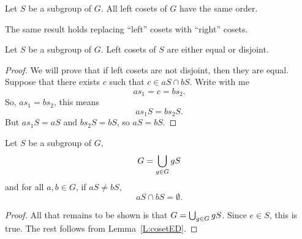\documentclass{ximera}
\begin{document}
\begin{corollary}
  Let $S$ be a subgroup of $G$. All left cosets of $G$ have the same
  order.
\end{corollary}

\begin{remark}
  The same result holds replacing ``left'' cosets with ``right''
  cosets.
\end{remark}



\begin{lemma}\label{L:cosetED}
  Let $S$ be a subgroup of $G$. Left cosets of $S$ are either equal or
  disjoint.
  \begin{proof}
    We will prove that if left cosets are not disjoint, then they are
    equal. Suppose that there exists $c$ such that $c\in aS \cap
    bS$. Write with me
    \[
    as_1 = c = bs_2.
    \]
    So, $as_1 = bs_2$, this means
    \[
    as_1 S = bs_2 S.
    \]
    But $as_1S = aS$ and $bs_2 S = bS$, so $aS = bS$.
  \end{proof}
\end{lemma}



\begin{theorem}\label{T:CPG}
  Let $S$ be a subgroup of $G$, 
  \[
  G = \bigcup_{g\in G} gS
  \]
  and for all $a,b\in G$, if $aS \ne bS$,
  \[
  aS\cap bS = \emptyset.
  \]
  \begin{proof}
    All that remains to be shown is that $G = \bigcup_{g\in G}
    gS$. Since $e\in S$, this is true. The rest follows from
    Lemma~\ref{L:cosetED}.
  \end{proof}
\end{theorem}






\end{document}
